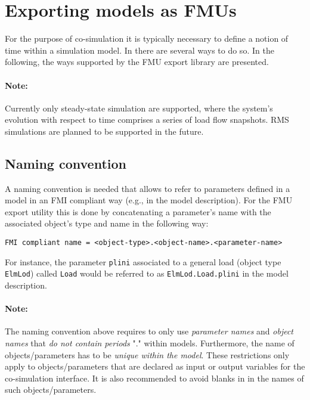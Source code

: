 
\chapter{Exporting \pf models as FMUs}
\label{sec:export}

For the purpose of co-simulation it is typically necessary to define a notion of time within a simulation model.
In \pf there are several ways to do so.
In the following, the ways supported by the \fmipp \pf FMU export library are presented.

\subsubsection*{Note:}
Currently only steady-state simulation are supported, where the system's evolution with respect to time comprises a series of load flow snapshots.
RMS simulations are planned to be supported in the future.


\section{Naming convention}
\label{sec:export:naming_convention}

A naming convention is needed that allows to refer to parameters defined in a \pf model in an FMI compliant way (e.g., in the model description).
For the \fmipp \pf FMU export utility this is done by concatenating a parameter's name with the associated object's type and name in the following way:
\begin{verbatim}
FMI compliant name = <object-type>.<object-name>.<parameter-name>
\end{verbatim}
For instance, the parameter \texttt{plini} associated to a general load (object type \texttt{ElmLod}) called \texttt{Load} would be referred to as \texttt{ElmLod.Load.plini} in the model description.


\subsubsection*{Note:}
The naming convention above requires to only use \emph{parameter names} and \emph{object names} that \emph{do not contain periods} "." within \pf models.
Furthermore, the name of objects/parameters has to be \emph{unique within the model}.
These restrictions only apply to objects/parameters that are declared as input or output variables for the co-simulation interface.
It is also recommended to avoid blanks in in the names of such objects/parameters.


